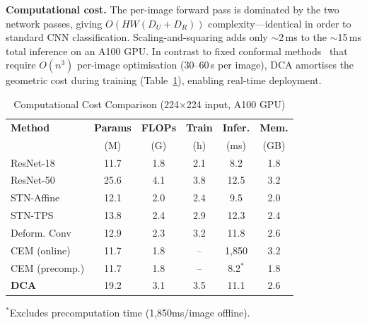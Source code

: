 \textbf{Computational cost.} The per-image forward pass is dominated by the two
network passes, giving $O(HW(D_U+D_R))$ complexity---identical in order to
standard CNN classification. Scaling-and-squaring adds only $\sim$2\,ms to the
$\sim$15\,ms total inference on an A100 GPU. In contrast to fixed conformal
methods~\cite{huang2024surface} that require $O(n^3)$ per-image optimisation
(30--60\,s per image), DCA amortises the geometric cost during training
(Table~\ref{tab:computational}), enabling real-time deployment.

\begin{table}[t]
\centering
\caption{Computational Cost Comparison (224$\times$224 input, A100 GPU)}
\label{tab:computational}
\begin{tabularx}{\textwidth}{Xccccc}
\hline
\textbf{Method} & \textbf{Params} & \textbf{FLOPs} & \textbf{Train} & \textbf{Infer.} & \textbf{Mem.} \\
 & (M) & (G) & (h) & (ms) & (GB) \\
\hline
ResNet-18 & 11.7 & 1.8 & 2.1 & 8.2 & 1.8 \\
ResNet-50 & 25.6 & 4.1 & 3.8 & 12.5 & 3.2 \\
STN-Affine & 12.1 & 2.0 & 2.4 & 9.5 & 2.0 \\
STN-TPS & 13.8 & 2.4 & 2.9 & 12.3 & 2.4 \\
Deform. Conv & 12.9 & 2.3 & 3.2 & 11.8 & 2.6 \\
CEM (online) & 11.7 & 1.8 & -- & 1,850 & 3.2 \\
CEM (precomp.) & 11.7 & 1.8 & -- & 8.2$^*$ & 1.8 \\
\textbf{DCA} & 19.2 & 3.1 & 3.5 & 11.1 & 2.6 \\
\hline
\end{tabularx}

\vspace{1mm}
\footnotesize{$^*$Excludes precomputation time (1,850ms/image offline).}
\end{table}
